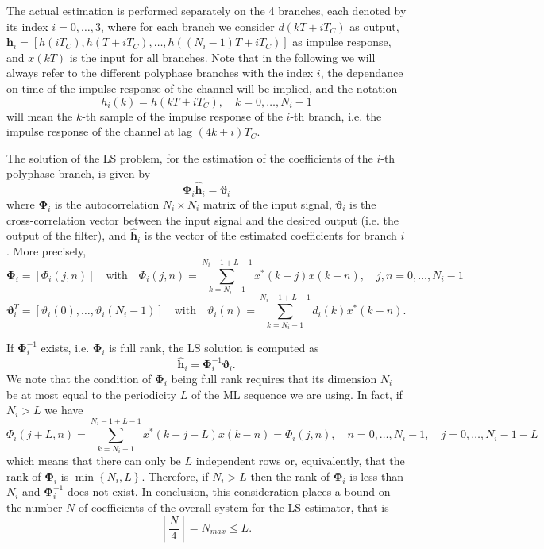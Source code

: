 \documentclass[10pt]{article}
\begin{document}
The actual estimation is performed separately on the 4 branches, each denoted by its index $i = 0,\ldots,3$, where for each branch we consider $d(kT+iT_C)$ as output, $\mathbf{h}_i = [h(iT_C), h(T+iT_C), \ldots, h((N_i-1)T + iT_C)]$ as impulse response, and $x(kT)$ is the input for all branches. Note that in the following we will always refer to the different polyphase branches with the index $i$, the dependance on time of the impulse response of the channel will be implied, and the notation
\begin{equation}\label{eq:def_ir_branch}
h_i(k) = h(kT+iT_C), \quad k=0,\ldots,N_i-1
\end{equation}
will mean the $k$-th sample of the impulse response of the $i$-th branch, i.e. the impulse response of the channel at lag $(4k+i)T_C$.

The solution of the LS problem, for the estimation of the coefficients of the $i$-th polyphase branch, is given by
\begin{equation}
	\mathbf{\Phi}_i \mathbf{\hat{h}}_i = \boldsymbol\vartheta_i
\end{equation}
where $\mathbf{\Phi}_i$ is the autocorrelation $N_i \times N_i$ matrix of the input signal, $ \boldsymbol\vartheta_i$ is the cross-correlation vector between the input signal and the desired output (i.e. the output of the filter), and $\mathbf{\hat{h}}_i$ is the vector of the estimated coefficients for branch $i$. More precisely,
\begin{equation}
	\mathbf{\Phi}_i = [\Phi_i(j,n)] \quad \mathrm{ with } \quad \Phi_i(j,n) = \sum_{k=N_i-1}^{N_i-1+L-1} x^*(k-j)x(k-n), \quad j,n=0,\ldots,N_i-1
\end{equation}
\begin{equation}
	\boldsymbol\vartheta_i ^T = [\vartheta_i(0),\ldots, \vartheta_i(N_i-1)] \quad \mathrm{ with } \quad \vartheta_i(n) = \sum_{k=N_i-1}^{N_i-1+L-1} d_i(k)x^*(k-n).
\end{equation}

If $\mathbf{\Phi}_i^{-1}$ exists, i.e. $\mathbf{\Phi}_i$ is full rank, the LS solution is computed as
\begin{equation}
	\mathbf{\hat{h}}_i = \mathbf{\Phi}_i^{-1} \boldsymbol\vartheta_i.
\end{equation}
We note that the condition of $\mathbf{\Phi}_i$ being full rank requires that its dimension $N_i$ be at most equal to the periodicity $L$ of the ML sequence we are using. In fact, if $N_i > L$ we have
\begin{equation}
	\Phi_i(j+L, n) = \sum_{k=N_i-1}^{N_i-1+L-1} x^*(k-j-L)x(k-n) = \Phi_i(j, n), \quad n=0,\ldots,N_i-1, \quad j = 0,\ldots,N_i-1-L
\end{equation}
which means that there can only be $L$ independent rows or, equivalently, that the rank of $\mathbf{\Phi}_i$ is $\min \left\lbrace N_i, L \right\rbrace$. Therefore, if $N_i > L$ then the rank of $\mathbf{\Phi}_i$ is less than $N_i$ and $\mathbf{\Phi}_i^{-1}$ does not exist. In conclusion, this consideration places a bound on the number $N$ of coefficients of the overall system for the LS estimator, that is
\begin{equation}
	\left\lceil\frac{N}{4}\right\rceil = N_{max} \leq L.
\end{equation}
\end{document}
